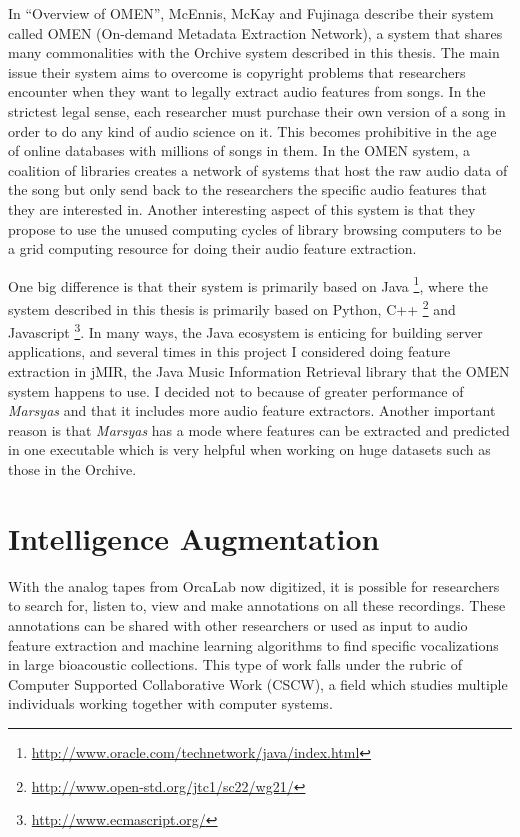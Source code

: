 \documentclass[12pt,oneside]{book}
\begin{document}
In ``Overview of OMEN''\cite{mcennis2006omen}, McEnnis, McKay and
Fujinaga describe their system called OMEN (On-demand Metadata
Extraction Network), a system that shares many commonalities with the
Orchive system described in this thesis.  The main issue their
system aims to overcome is copyright problems that researchers
encounter when they want to legally extract audio features from songs.
In the strictest legal sense, each researcher must purchase their own
version of a song in order to do any kind of audio science on it.
This becomes prohibitive in the age of online databases with millions
of songs in them.  In the OMEN system, a coalition of libraries
creates a network of systems that host the raw audio data of the song
but only send back to the researchers the specific audio features that
they are interested in.  Another interesting aspect of this system is
that they propose to use the unused computing cycles of library
browsing computers to be a grid computing resource for doing their
audio feature extraction.

One big difference is that their system is primarily based on
Java \footnote{\url{http://www.oracle.com/technetwork/java/index.html}},
where the system described in this thesis is primarily based on
Python, C++ \footnote{\url{http://www.open-std.org/jtc1/sc22/wg21/}}
and Javascript \footnote{\url{http://www.ecmascript.org/}}.  In many
ways, the Java ecosystem is enticing for building server applications,
and several times in this project I considered doing feature
extraction in jMIR, the Java Music Information Retrieval library that
the OMEN system happens to use.  I decided not to because of greater
performance of \textit{Marsyas} and that it includes more audio feature
extractors.  Another important reason is that \textit{Marsyas} has a mode where
features can be extracted and predicted in one executable which is
very helpful when working on huge datasets such as those in the
Orchive.

\section{Intelligence Augmentation}
\label{section:relatedWork:intelligenceAugmentation}

With the analog tapes from OrcaLab now digitized, it is possible for
researchers to search for, listen to, view and make annotations on all
these \totalNumberOfOrchiveRecordings recordings.  These annotations
can be shared with other researchers or used as input to audio feature
extraction and machine learning algorithms to find specific
vocalizations in large bioacoustic collections.  This type of work
falls under the rubric of Computer Supported Collaborative Work
\cite{bannon1991cscw} (CSCW), a field which studies multiple
individuals working together with computer systems.
\end{document}
